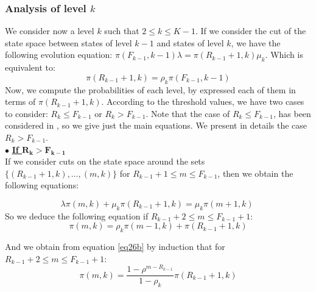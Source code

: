 \documentclass[conference]{IEEEtran}
\begin{document}


\subsubsection{Analysis of level $k$}

We consider now a level $k$ such that $2 \leq  k \leq K-1$. If we consider the cut  of the state space between states of level $k-1$ and states of level $k$,  we have   the following  evolution equation: $\pi(F_{k-1},k-1) \lambda=  \pi(R_{k-1}+1,k) \mu_k$. Which is equivalent to:
\begin{equation}
\pi(R_{k-1}+1,k)= \rho_k \pi(F_{k-1},k-1)
\label{eq14b}
\end{equation}
Now, we compute the probabilities of each level, by
expressed  each of them in terms of  $\pi(R_{k-1}+1,k)$. According to the threshold values,
we have two cases to consider:
$R_{k} \leq F_{k-1}$ or  $R_{k} > F_{k-1}$. Note that the case of $R_{k} \leq F_{k-1}$, has been considered in \cite{le2000simple}, so we give just the main equations. We present in details the case $R_{k} > F_{k-1}$. \\
\noindent
$\bullet$ \underline{{\textbf{If $\mathbf{R_{k} > F_{k-1}}$ }}} \\
\noindent
If we consider cuts on the state space around the sets $\{(R_{k-1}+1,k), \ldots,(m,k)\}$ for  $R_{k-1}+1 \leq m \leq F_{k-1}$, then we obtain
the following equations: 

\begin{equation}
\lambda \pi(m,k) + \mu_k \pi(R_{k-1}+1,k) = \mu_k \pi(m+1,k) \; \label{eq9b}
\end{equation}
\noindent
So we deduce the following equation if $ R_{k-1}+2 \leq m \leq F_{k-1}+1$:
\begin{equation}
\pi(m,k) = \rho_k \pi(m-1,k)+ \pi(R_{k-1}+1,k)
\label{eq26b}
\end{equation}

\noindent And we obtain from equation \ref{eq26b} by induction that  for  $R_{k-1}+2 \leq m \leq F_{k-1}+1$:
\begin{equation}
\pi(m,k)=\frac{1-\rho^{m-R_{k-1}} }{1-\rho_k}\pi(R_{k-1}+1,k)
\label{eq40b}
 \end{equation}
\end{document}
